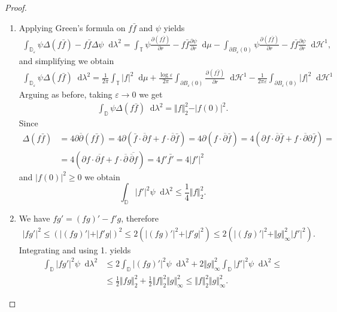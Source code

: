 \documentclass[letterpaper, 11pt]{article}
\newcommand{\D}{\mathbb{D}}
\newcommand{\T}{\mathbb{T}}
\newcommand{\1}{\mathds{1}}
\newcommand{\dd}{\mathop{}\!\mathrm{d}}
\newcommand{\wirtzbar}{\overline{\partial}}
\theoremstyle{definition}
\begin{document}
\begin{proof} {\ }
  \begin{enumerate}
    \item Applying Green's formula on $f \bar{f}$ and $\psi$ yields
    \begin{align*}
      \int_{\D_\varepsilon} \psi \Delta (f \bar{f}) - f \bar{f} \Delta \psi \dd \lambda^2 = \int_\T \psi \frac{\partial (f \bar{f})}{\partial r} - f \bar{f} \frac{\partial \psi}{\partial r} \dd \mu - \int_{\partial B_\varepsilon(0)} \psi \frac{\partial (f \bar{f})}{\partial r} - f \bar{f} \frac{\partial \psi}{\partial r} \dd \mathcal{H}^1,
    \end{align*}
    and simplifying we obtain
    \begin{align*}
      \int_{\D_\varepsilon} \psi \Delta (f \bar{f}) \dd \lambda^2 = \frac{1}{2\pi} \int_\T \vert f \vert^2 \dd \mu + \frac{\log \varepsilon}{2\pi} \int_{\partial B_\varepsilon(0)} \frac{\partial (f \bar{f})}{\partial r} \dd \mathcal{H}^1 - \frac{1}{2\pi\varepsilon} \int_{\partial B_\varepsilon(0)} \vert f \vert^2 \dd \mathcal{H}^1
    \end{align*}
    Arguing as before, taking $\varepsilon \to 0$ we get
    \begin{align*}
      \int_\D \psi \Delta (f \bar{f}) \dd \lambda^2 = \Vert f \Vert_2^2 - \vert f(0) \vert^2.
    \end{align*}
    Since
    \begin{align*}
      \Delta(f \bar{f}) &= 4 \partial \wirtzbar (f \bar{f}) = 4 \partial ( \bar{f} \cdot \wirtzbar f + f \cdot \wirtzbar \bar{f} ) = 4 \partial (f \cdot \wirtzbar \bar{f}) = 4 (\partial f \cdot \wirtzbar \bar{f} + f \cdot \wirtzbar \partial \bar{f}) = \\
      &= 4 (\partial f \cdot \overline{\partial f} + f \cdot \wirtzbar \,\overline{ \wirtzbar f }) = 4 f' \bar{f'} = 4 \vert f' \vert^2
    \end{align*}
    and $ \vert f(0) \vert^2 \geq 0$ we obtain
    $$ \int_\D \vert f' \vert^2 \psi \dd \lambda^2 \leq \frac{1}{4} \Vert f \Vert_2^2. $$

    \item We have $f g' = (f g)' - f' g$, therefore
    \begin{align*}
      \vert f g' \vert^2 \leq (\vert (f g)' \vert + \vert f' g \vert)^2 \leq 2(\vert (fg)' \vert^2 + \vert f' g \vert^2) \leq 2(\vert (fg)' \vert^2 + \Vert g \Vert_\infty^2 \vert f' \vert^2).
    \end{align*}
    Integrating and using 1. yields
    \begin{align*}
      \int_\D \vert f g' \vert^2 \psi \dd \lambda^2 &\leq 2 \int_\D \vert (f g)' \vert^2 \psi \dd \lambda^2 + 2 \Vert g \Vert_\infty^2 \int_\D \vert f' \vert^2 \psi \dd \lambda^2 \leq \\
      &\leq \frac{1}{2} \Vert f g \Vert_2^2 + \frac{1}{2} \Vert f \Vert_2^2 \Vert g \Vert_\infty^2 \leq \Vert f \Vert_2^2 \Vert g \Vert_\infty^2.
    \end{align*}


\end{enumerate}
\end{proof}
\end{document}
